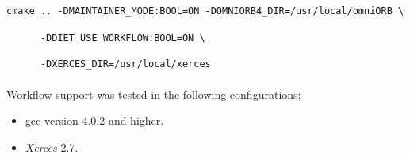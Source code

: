 \verb|cmake .. -DMAINTAINER_MODE:BOOL=ON -DOMNIORB4_DIR=/usr/local/omniORB \|

\verb|      -DDIET_USE_WORKFLOW:BOOL=ON \|

\verb|      -DXERCES_DIR=/usr/local/xerces|


\paragraph{}
Workflow support was tested in the following configurations:

\begin{itemize}
\item gcc version 4.0.2 and higher.
\item \textit{Xerces} 2.7.
\end{itemize}

%
%
%
%
%
%
%
%
